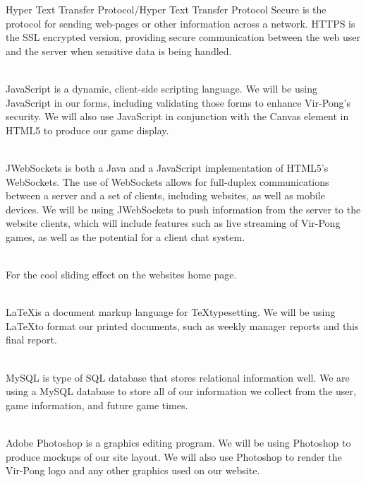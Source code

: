 \begin{description}
			Hyper Text Transfer Protocol/Hyper Text Transfer Protocol Secure is the  protocol for sending web-pages or other information across a network. HTTPS is the SSL encrypted version, providing secure communication between the web user and the server when sensitive data is being handled.
		\item[JavaScript - \url{http://w3schools.com/js}] \hfill \\
			JavaScript is a dynamic, client-side scripting language. We will be using JavaScript in our forms, including validating those forms to enhance Vir-Pong's security. We will also use JavaScript in conjunction with the Canvas element in HTML5 to produce our game display.
		\item[JWebSockets - \url{http://jwebsocket.org/}] \hfill \\
			JWebSockets is both a Java and a JavaScript implementation of HTML5's WebSockets. The use of WebSockets allows for full-duplex communications between a server and a set of clients, including websites, as well as mobile devices. We will be using JWebSockets to push information from the server to the website clients, which will include features such as live streaming of Vir-Pong games, as well as the potential for a client chat system.
		\item[Coda-Slider - \url{http://www.ndoherty.biz/2009/10/coda-slider-2/}] \hfill \\
			For the cool sliding effect on the websites home page.
		\item[\LaTeX - \url{http://latex-project.org}] \hfill \\
			\LaTeX is a document markup language for \TeX typesetting. We will be using \LaTeX to format our printed documents, such as weekly manager reports and this final report.
		\item[MySQL -  \url{http://dev.mysql.com/downloads/mysql/}] \hfill \\
			MySQL is  type of SQL database that stores relational information well. We are using a MySQL database to store all of our information we collect from the user, game information, and future game times.
		\item[Photoshop - \url{http://photoshop.com}] \hfill \\
			Adobe Photoshop is a graphics editing program. We will be using Photoshop to produce mockups of our site layout. We will also use Photoshop to render the Vir-Pong logo and any other graphics used on our website.
		\item[PHP - \url{http://php.net}] \hfill \\

\end{description}

